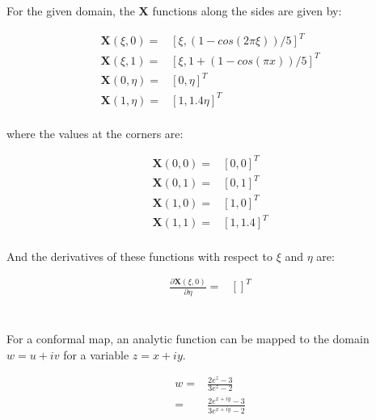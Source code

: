 \documentclass[10pt]{article}
\begin{document}
For the given domain, the \textbf{X} functions along the sides are given by:

\begin{equation}
\begin{aligned}
\textbf{X}(\xi, 0)=& \left\lbrack\xi, (1-cos(2\pi\xi))/5\right\rbrack^T\\
\textbf{X}(\xi, 1)=& \left\lbrack\xi, 1+(1-cos(\pi x))/5\right\rbrack^T\\
\textbf{X}(0, \eta)=& \left\lbrack0, \eta\right\rbrack^T\\
\textbf{X}(1, \eta)=& \left\lbrack1, 1.4\eta\right\rbrack^T\\
\end{aligned}
\end{equation}

where the values at the corners are:

\begin{equation}
\begin{aligned}
\textbf{X}(0, 0)=& \left\lbrack0, 0\right\rbrack^T\\
\textbf{X}(0, 1)=& \left\lbrack0, 1\right\rbrack^T\\
\textbf{X}(1, 0)=& \left\lbrack1, 0\right\rbrack^T\\
\textbf{X}(1, 1)=& \left\lbrack1, 1.4\right\rbrack^T\\
\end{aligned}
\end{equation}

And the derivatives of these functions with respect to \(\xi\) and \(\eta\) are:

\begin{equation}
\begin{aligned}
\frac{\partial\textbf{X}(\xi, 0)}{\partial\eta}=& \left\lbrack\right\rbrack^T
\end{aligned}
\end{equation}

\section{}

For a conformal map, an analytic function can be mapped to the domain \(w=u+iv\) for a variable \(z=x+iy\).

\begin{equation}
\begin{aligned}
w=&\frac{2e^z-3}{3e^z-2}\\
=& \frac{2e^{x+iy}-3}{3e^{x+iy}-2}\\
\end{aligned}
\end{equation}
\end{document}
